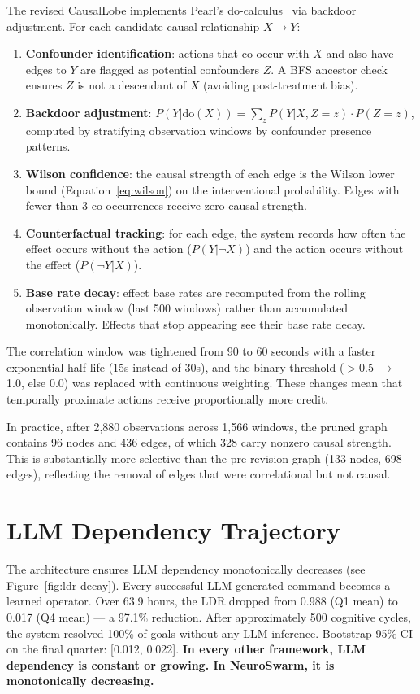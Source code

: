 \documentclass[12pt,a4paper]{report}
\begin{document}
The revised CausalLobe implements Pearl's do-calculus~\cite{pearl2009causality} via backdoor adjustment. For each candidate causal relationship $X \to Y$:
\begin{enumerate}
    \item \textbf{Confounder identification}: actions that co-occur with $X$ and also have edges to $Y$ are flagged as potential confounders $Z$. A BFS ancestor check ensures $Z$ is not a descendant of $X$ (avoiding post-treatment bias).
    \item \textbf{Backdoor adjustment}: $P(Y|\text{do}(X)) = \sum_z P(Y|X, Z\!=\!z) \cdot P(Z\!=\!z)$, computed by stratifying observation windows by confounder presence patterns.
    \item \textbf{Wilson confidence}: the causal strength of each edge is the Wilson lower bound (Equation~\ref{eq:wilson}) on the interventional probability. Edges with fewer than 3 co-occurrences receive zero causal strength.
    \item \textbf{Counterfactual tracking}: for each edge, the system records how often the effect occurs without the action ($P(Y|\neg X)$) and the action occurs without the effect ($P(\neg Y|X)$).
    \item \textbf{Base rate decay}: effect base rates are recomputed from the rolling observation window (last 500 windows) rather than accumulated monotonically. Effects that stop appearing see their base rate decay.
\end{enumerate}

The correlation window was tightened from 90 to 60 seconds with a faster exponential half-life (15s instead of 30s), and the binary threshold ($>$0.5 $\to$ 1.0, else 0.0) was replaced with continuous weighting. These changes mean that temporally proximate actions receive proportionally more credit.

In practice, after 2{,}880 observations across 1{,}566 windows, the pruned graph contains 96 nodes and 436 edges, of which 328 carry nonzero causal strength. This is substantially more selective than the pre-revision graph (133 nodes, 698 edges), reflecting the removal of edges that were correlational but not causal.

\section{LLM Dependency Trajectory}
The architecture ensures LLM dependency monotonically decreases (see Figure~\ref{fig:ldr-decay}). Every successful LLM-generated command becomes a learned operator. Over 63.9 hours, the LDR dropped from 0.988 (Q1 mean) to 0.017 (Q4 mean) --- a 97.1\% reduction. After approximately 500 cognitive cycles, the system resolved 100\% of goals without any LLM inference. Bootstrap 95\% CI on the final quarter: [0.012, 0.022]. \textbf{In every other framework, LLM dependency is constant or growing. In NeuroSwarm, it is monotonically decreasing.}
\end{document}
